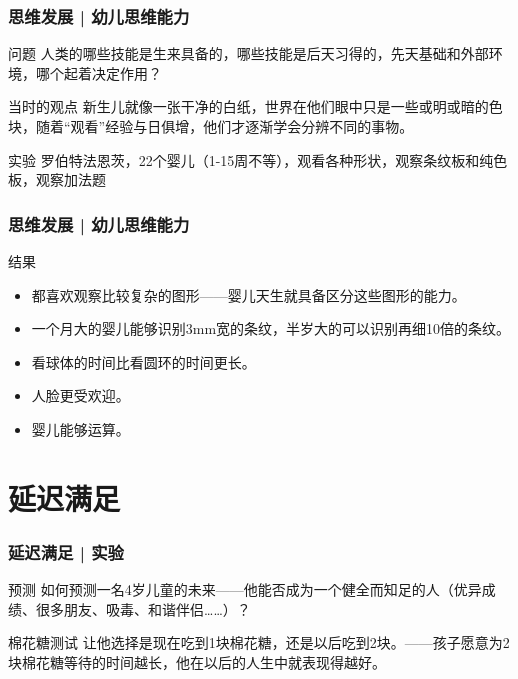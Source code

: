 \begin{frame}
  \frametitle{思维发展 | 幼儿思维能力}
  \begin{block}{问题}
    人类的哪些技能是生来具备的，哪些技能是后天习得的，先天基础和外部环境，哪个起着决定作用？
  \end{block}
  \pause
  \begin{block}{当时的观点}
    新生儿就像一张干净的白纸，世界在他们眼中只是一些或明或暗的色块，随着“观看”经验与日俱增，他们才逐渐学会分辨不同的事物。
  \end{block}
  \pause
  \begin{block}{实验}
    罗伯特\textbullet 法恩茨，22个婴儿（1-15周不等），观看各种形状，观察条纹板和纯色板，观察加法题
  \end{block}
\end{frame}

\begin{frame}
  \frametitle{思维发展 | 幼儿思维能力}
  \begin{block}{结果}
    \begin{itemize}
      \item 都喜欢观察比较复杂的图形——婴儿天生就具备区分这些图形的能力。
      \item 一个月大的婴儿能够识别3mm宽的条纹，半岁大的可以识别再细10倍的条纹。
      \item 看球体的时间比看圆环的时间更长。
      \item 人脸更受欢迎。
      \item 婴儿能够运算。
    \end{itemize}
  \end{block}
\end{frame}

\section{延迟满足}
\begin{frame}
  \frametitle{延迟满足 | 实验}
  \begin{block}{预测}
    如何预测一名4岁儿童的未来——他能否成为一个健全而知足的人（优异成绩、很多朋友、吸毒、和谐伴侣……）？
  \end{block}
  \pause
  \begin{block}{棉花糖测试}
    让他选择是现在吃到1块棉花糖，还是以后吃到2块。——孩子愿意为2块棉花糖等待的时间越长，他在以后的人生中就表现得越好。
  \end{block}
\end{frame}

